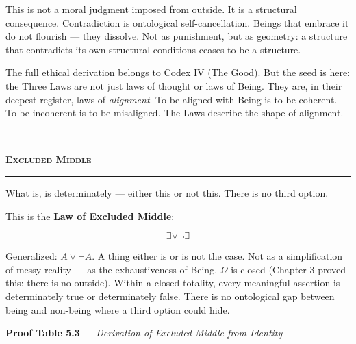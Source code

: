 \documentclass[10pt, openany, oneside]{book}
\renewcommand{\normalsize}{\fontsize{10}{13}\selectfont}
\begin{document}
This is not a moral judgment imposed from outside. It is a structural consequence. Contradiction is ontological self-cancellation. Beings that embrace it do not flourish --- they dissolve. Not as punishment, but as geometry: a structure that contradicts its own structural conditions ceases to be a structure.

The full ethical derivation belongs to Codex IV (The Good). But the seed is here: the Three Laws are not just laws of thought or laws of Being. They are, in their deepest register, laws of \textit{alignment}. To be aligned with Being is to be coherent. To be incoherent is to be misaligned. The Laws describe the shape of alignment.

\vspace{1.5em}


\begin{center}
    \rule{0.3\textwidth}{0.4pt}\\[0.5em]
    {\normalsize\bfseries\scshape Excluded Middle}\\[0.3em]
    \rule{0.3\textwidth}{0.4pt}
\end{center}

\vspace{1em}

\noindent What is, is determinately --- either this or not this. There is no third option.

This is the \textbf{Law of Excluded Middle}:

$$\exists \vee \neg\exists$$

Generalized: $A \vee \neg A$. A thing either is or is not the case. Not as a simplification of messy reality --- as the exhaustiveness of Being. $\Omega$ is closed (Chapter 3 proved this: there is no outside). Within a closed totality, every meaningful assertion is determinately true or determinately false. There is no ontological gap between being and non-being where a third option could hide.

\vspace{0.5em}

\textbf{Proof Table 5.3} --- \textit{Derivation of Excluded Middle from Identity}

\vspace{0.5em}
\end{document}
